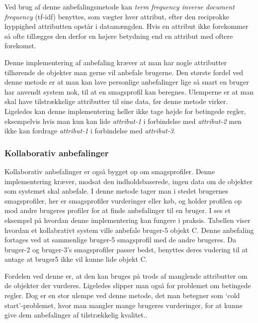 Ved brug af denne anbefalingsmetode kan \textit{term frequency inverse document frequency} (tf-idf) benyttes, som vægter hver attribut, efter den reciprokke hyppighed attributten opstår i datamængden.
Hvis en attribut ikke forekommer så ofte tillægges den derfor en højere betydning end en attribut med oftere forekomst.

Denne implementering af anbefaling kræver at man har nogle attributter tilhørende de objekter man gerne vil anbefale brugerne.
Den største fordel ved denne metode er at man kan lave personlige anbefalinger lige så snart en bruger har anvendt system nok, til at en smagsprofil kan beregnes.
Ulemperne er at man skal have tilstrækkelige attributter til sine data, før denne metode virker. 
Ligeledes kan denne implementering heller ikke tage højde for betingede regler, eksempelvis hvis man kun kan lide \textit{attribut-1} i forbindelse med \textit{attribut-2} men ikke kan fordrage \textit{attribut-1} i forbindelse med \textit{attribut-3}.

\subsubsection{Kollaborativ anbefalinger}
Kollaborativ anbefalinger er også bygget op om smagsprofiler.
Denne implementering kræver, modsat den indholdsbaserede, ingen data om de objekter som systemet skal anbefale. 
I denne metode tager man i stedet brugernes smagsprofiler, her er smagsprofiler vurderinger eller køb, og holder profilen op mod andre brugeres profiler for at finde anbefalinger til en bruger.
I  ses et eksempel på hvordan denne implementering kan fungere i praksis.
Tabellen viser hvordan et kollabrativt system ville anbefale bruger-5 objekt C.
Denne anbefaling fortages ved at sammenlige bruger-5 smagsprofil med de andre brugeres.
Da bruger-2 og bruger-3's smagsprofiler passer bedst, benyttes deres vudering til at antage at bruger5 ikke vil kunne lide objekt C.
\citep{kollabrativEksempel}

Fordelen ved denne er, at den kan bruges på trods af manglende attributter om de objekter der vurderes.
Ligeledes slipper man også for problemet om betingede regler.
Dog er en stor ulempe ved denne metode, det man betegner som ‘cold start’-problemet, hvor man mangler mange brugeres vurderinger, for at kunne give dem anbefalinger af tilstrækkelig kvalitet.\citep{RecommenderSystems}.


